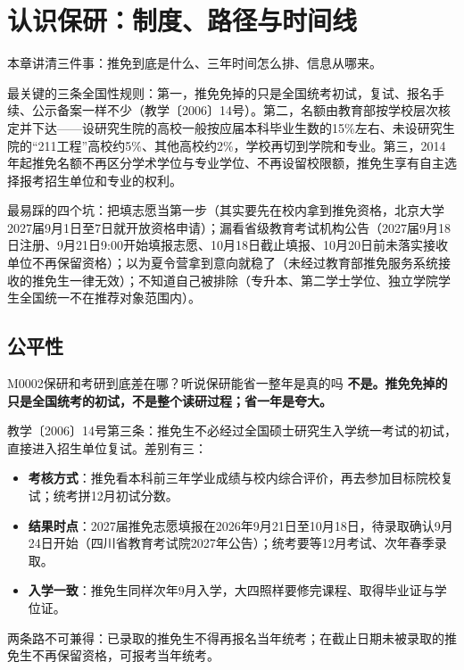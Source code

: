\chapter{认识保研：制度、路径与时间线}
\label{ch01}
\begin{keybox}
本章讲清三件事：推免到底是什么、三年时间怎么排、信息从哪来。

最关键的三条全国性规则：第一，推免免掉的只是全国统考初试，复试、报名手续、公示备案一样不少（教学〔2006〕14号）。第二，名额由教育部按学校层次核定并下达——设研究生院的高校一般按应届本科毕业生数的15\%左右、未设研究生院的“211工程”高校约5\%、其他高校约2\%，学校再切到学院和专业。第三，2014年起推免名额不再区分学术学位与专业学位、不再设留校限额，推免生享有自主选择报考招生单位和专业的权利。

最易踩的四个坑：把填志愿当第一步（其实要先在校内拿到推免资格，北京大学2027届9月1日至7日就开放资格申请）；漏看省级教育考试机构公告（2027届9月18日注册、9月21日9:00开始填报志愿、10月18日截止填报、10月20日前未落实接收单位不再保留资格）；以为夏令营拿到意向就稳了（未经过教育部推免服务系统接收的推免生一律无效）；不知道自己被排除（专升本、第二学士学位、独立学院学生全国统一不在推荐对象范围内）。
\end{keybox}

\section{公平性}
\begin{qa}{M0002}{保研和考研到底差在哪？听说保研能省一整年是真的吗}
\textbf{不是。推免免掉的只是全国统考的初试，不是整个读研过程；省一年是夸大。}

教学〔2006〕14号第三条：推免生不必经过全国硕士研究生入学统一考试的初试，直接进入招生单位复试。差别有三：

\begin{itemize}
  \item \textbf{考核方式}：推免看本科前三年学业成绩与校内综合评价，再去参加目标院校复试；统考拼12月初试分数。
  \item \textbf{结果时点}：2027届推免志愿填报在2026年9月21日至10月18日，待录取确认9月24日开始（四川省教育考试院2027年公告）；统考要等12月考试、次年春季录取。
  \item \textbf{入学一致}：推免生同样次年9月入学，大四照样要修完课程、取得毕业证与学位证。
\end{itemize}

两条路不可兼得：已录取的推免生不得再报名当年统考；在截止日期未被录取的推免生不再保留资格，可报考当年统考。
\end{qa}

